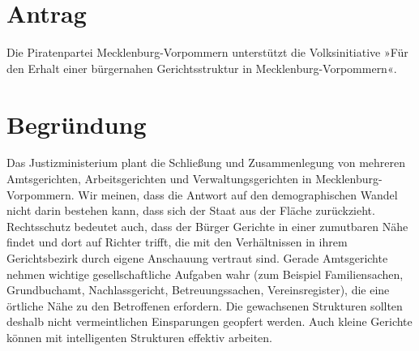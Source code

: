 \section{Antrag}

Die Piratenpartei Mecklenburg-Vorpommern unterstützt die Volksinitiative »Für den Erhalt einer bürgernahen Gerichtsstruktur in Mecklenburg-Vorpommern«.

\section{Begründung}

Das Justizministerium plant die Schließung und Zusammenlegung von mehreren Amtsgerichten, Arbeitsgerichten und Verwaltungsgerichten in Mecklenburg-Vorpommern. Wir meinen, dass die Antwort auf den demographischen Wandel nicht darin bestehen kann, dass sich der Staat aus der Fläche zurückzieht. Rechtsschutz bedeutet auch, dass der Bürger Gerichte in einer zumutbaren Nähe findet und dort auf Richter trifft, die mit den Verhältnissen in ihrem Gerichtsbezirk durch eigene Anschauung vertraut sind. Gerade Amtsgerichte nehmen wichtige gesellschaftliche Aufgaben wahr (zum Beispiel Familiensachen, Grundbuchamt, Nachlassgericht, Betreuungssachen, Vereinsregister), die eine örtliche Nähe zu den Betroffenen erfordern. Die gewachsenen Strukturen sollten deshalb nicht vermeintlichen Einsparungen geopfert werden. Auch kleine Gerichte können mit intelligenten Strukturen effektiv arbeiten.
